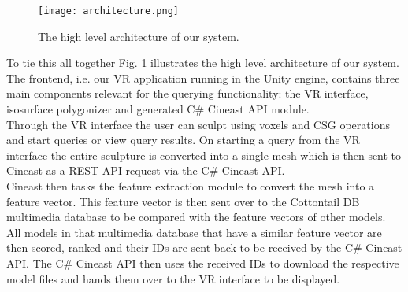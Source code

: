 \begin{figure}
\centering
\captionsetup{width=0.8\textwidth}
\texttt{[image: architecture.png]}
\caption{The high level architecture of our system.}
\label{fig:architecture}
\end{figure}

To tie this all together Fig. \ref{fig:architecture} illustrates the high level architecture of our system. The frontend, i.e. our VR application running in the Unity
engine, contains three main components relevant for the querying functionality: the VR interface, isosurface polygonizer and generated C\# Cineast API module.\\
Through the VR interface the user can sculpt using voxels and CSG operations and start queries or view query results. On starting a query from the VR interface the entire sculpture is converted into a single mesh which is then sent to Cineast as a REST API request via the C\# Cineast API.\\
Cineast then tasks the feature extraction module to convert the mesh into a feature vector. This feature vector is then sent over to the Cottontail DB multimedia database to be
compared with the feature vectors of other models. All models in that multimedia database that have a similar feature vector are then scored, ranked and their IDs are sent back to be received by the C\# Cineast API. The C\# Cineast API then uses the received IDs to download the respective model files and hands them over to the VR interface to be displayed.

